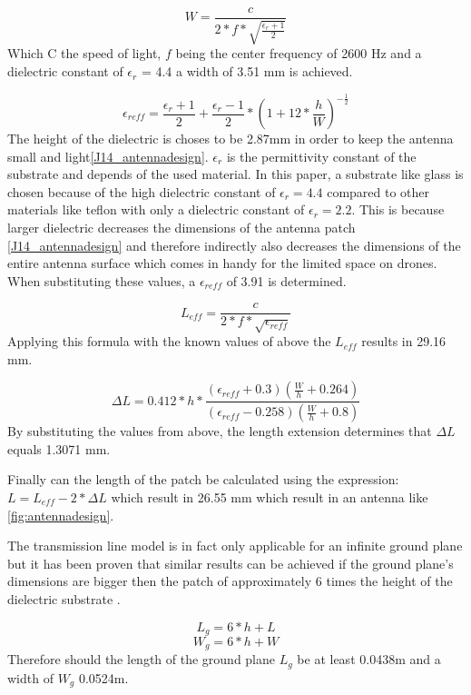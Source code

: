 \begin{equation} 
W = \frac{c}{2*f*\sqrt{\frac{\epsilon_r+1}{2}}}
\end{equation}
Which C the speed of light, $f$ being the center frequency of 2600 Hz and a dielectric constant of $\epsilon_r$ = 4.4 a width of 3.51 mm is achieved.

$$\epsilon_{reff} = \frac{\epsilon_r+1}{2}+  \frac{\epsilon_r-1}{2} * \left(1+12*\frac{h}{W}\right)^{-\frac{1}{2}}$$
The height of the dielectric is choses to be 2.87mm in order to keep the antenna small and light\ref{J14_antennadesign}.
$\epsilon_r$ is the permittivity constant of the substrate and depends of the used material. In this paper, a substrate like glass 
is chosen because of the high dielectric constant of $\epsilon_r = 4.4$ compared to other materials like teflon with only a dielectric 
constant of $\epsilon_r = 2.2$. This is because larger dielectric decreases the dimensions of the antenna patch \ref{J14_antennadesign} 
and therefore indirectly also decreases the dimensions of the entire antenna surface which comes in handy for the limited space on 
drones. When substituting these values, a $\epsilon_{reff}$ of 3.91 is determined.

\begin{equation} 
L_{eff} = \frac{c}{2*f*\sqrt{\epsilon_{reff}}}
\end{equation}
Applying this formula with the known values of above the $L_{eff}$ results in 29.16 mm.

\begin{equation} 
\Delta L = 0.412*h*\frac{(\epsilon_{reff}+0.3)\left(\frac{W}{h}+0.264\right)}{\left(\epsilon_{reff}-0.258\right)\left(\frac{W}{h}+0.8\right)}
\end{equation}
By substituting the values from above, the length extension determines that $\Delta L$ equals 1.3071 mm.

Finally can the length of the patch be calculated using the expression: $L = L_{eff} - 2 * \Delta L$
which result in 26.55 mm which result in an antenna like \ref{fig:antennadesign}.

The transmission line model is in fact only applicable for an infinite ground plane but it has been proven that similar results
can be achieved if the ground plane's dimensions are bigger then the patch of approximately 6 times the height of the dielectric substrate \cite{J14_antennadesign,J15_antennadesign}.

\begin{equation} 
L_{g} = 6 * h + L
\end{equation}
\begin{equation} 
W_{g} = 6 * h + W
\end{equation}
Therefore should the length of the ground plane $L_{g}$ be at least 0.0438m and a width of $W_{g}$ 0.0524m.

